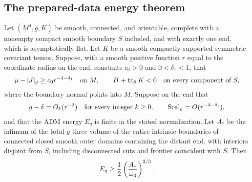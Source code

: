 \subsection{The prepared-data energy theorem}

\begin{theorem}\label{four:thm:prepared-energy}
Let $(M^4,g,K)$ be smooth,
connected, and orientable, complete with a nonempty compact smooth
boundary $S$ included, and with exactly one end, which is asymptotically flat.
Let $K$ be a smooth compactly supported symmetric covariant tensor.
Suppose, with a smooth positive function $r$ equal to the coordinate
radius on the end, constants
$c_0>0$ and $0<\delta_1<1$, that
\[
 \mu-|J|_g\ge c_0r^{-4-\delta_1}\quad\hbox{on }M,
 \qquad H+\operatorname{tr}_SK<0\quad\hbox{on every component of }S,
\]
where the boundary normal points into $M$.  Suppose on the end that
\[
 g-\delta=O_k(r^{-2})\quad\hbox{for every integer }k\ge0,
 \qquad \operatorname{Scal}_g=O(r^{-4-\delta_1}),
\]
and that the ADM energy $E_g$ is finite in the stated normalization.
Let $A_*$ be the infimum of the total $g$-three-volume of the entire
intrinsic boundaries of connected closed smooth outer domains
containing the distant end, with interiors disjoint from $S$,
including disconnected cuts and frontier coincident with $S$.
Then
\begin{equation}\label{four:ex:prepared-inequality}
 E_g\ge\frac12\left(\frac{A_*}{\omega_3}\right)^{2/3}.
\end{equation}
\end{theorem}

